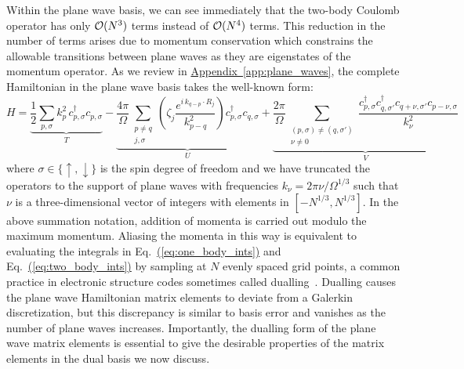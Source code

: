 \documentclass[superscriptaddress,aps,pra,nofootinbib,notitlepage,10pt,longbibliography]{revtex4-1}
\newcommand{\eq}[1]{Eq.~\hyperref[eq:#1]{(\ref*{eq:#1})}}
\DeclareRobustCommand{\app}[1]{\hyperref[app:#1]{Appendix~\ref*{app:#1}}}
\begin{document}
Within the plane wave basis, we can see immediately that the two-body Coulomb operator has only ${\cal O}(N^3)$ terms instead of ${\cal O}(N^4)$ terms. This reduction in the number of terms arises due to momentum conservation which constrains the allowable transitions between plane waves as they are eigenstates of the momentum operator. As we review in \app{plane_waves}, the complete Hamiltonian in the plane wave basis takes the well-known form:
\begin{equation}
 H = \underbrace{\frac{1}{2} \sum_{p, \sigma} k_p^2 \, c_{p,\sigma}^\dagger c_{p,\sigma}}_{T} - \underbrace{\frac{4 \pi}{\Omega} \sum_{\substack{p \neq q \\ j,\sigma}} \left(\zeta_j \frac{e^{i \, k_{q-p} \cdot R_j}}{k_{p-q}^2}\right) c^\dagger_{p, \sigma} c_{q, \sigma}}_{U} + \underbrace{\frac{2 \pi}{\Omega} \sum_{\substack{(p, \sigma) \neq (q, \sigma') \\ \nu \neq 0}} \frac{c^\dagger_{p,\sigma} c_{q,\sigma'}^\dagger c_{q + \nu,\sigma'} c_{p - \nu,\sigma}}{k_\nu^2}}_{V}
 \label{eq:periodic_coulomb}
\end{equation}
where $\sigma \in \{\uparrow, \downarrow\}$ is the spin degree of freedom and we have truncated the operators to the support of plane waves with frequencies $k_\nu = 2 \pi  \nu / \Omega^{1/3}$ such that $\nu$ is a three-dimensional vector of integers with elements in $[-N^{1/3}, N^{1/3}]$. In the above summation notation, addition of momenta is carried out modulo the maximum momentum. Aliasing the momenta in this way is equivalent to evaluating the integrals in \eq{one_body_ints} and \eq{two_body_ints} by sampling at $N$ evenly spaced grid points, a common practice in electronic structure codes sometimes called dualling~\cite{remler1990molecular,mcclain2017gaussian}. Dualling causes the plane wave Hamiltonian matrix elements to deviate from a Galerkin discretization, but this discrepancy is similar to basis error and vanishes as the number of plane waves increases. Importantly, the dualling form of the plane wave matrix elements is essential to give the desirable properties of the matrix elements in the dual basis we now discuss.
\end{document}

